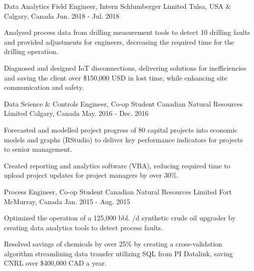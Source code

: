 \begin{cventries}
  \cventry
    {Data Analytics Field Engineer, Intern} %
    {Schlumberger Limited} %
    {Tulsa, USA \& Calgary, Canada} %
    {Jun. 2018 - Jul. 2018} %
    {
      \begin{cvitems} %
        \item {Analysed process data from drilling measurement tools to detect 10 drilling faults and provided adjustments for engineers, decreasing the required time for the drilling operation.}
        \item {Diagnosed and designed IoT disconnections, delivering solutions for inefficiencies and saving the client over \$150,000 USD in lost time, while enhancing site communication and safety.}
      \end{cvitems}
    }

  \cventry
    {Data Science \& Controls Engineer, Co-op Student} %
    {Canadian Natural Resources Limited} %
    {Calgary, Canada} %
    {May. 2016 - Dec. 2016} %
    {
      \begin{cvitems} %
        \item {Forecasted and modelled project progress of 80 capital projects into economic models and graphs (RStudio) to deliver key performance indicators for projects to senior management.}
        \item {Created reporting and analytics software (VBA), reducing required time to upload project updates for project managers by over 30\%.}
      \end{cvitems}
    }


  \cventry
    {Process Engineer, Co-op Student} %
    {Canadian Natural Resources Limited} %
    {Fort McMurray, Canada} %
    {Jan. 2015 - Aug. 2015} %
    {
      \begin{cvitems} %
        \item {Optimized the operation of a 125,000 bbl. /d synthetic crude oil upgrader by creating data analytics tools to detect process faults.}
        \item {Resolved savings of chemicals by over 25\% by creating a cross-validation algorithm streamlining data transfer utilizing SQL from PI Datalink, saving CNRL over \$400,000 CAD a year.}
      \end{cvitems}
    }

\end{cventries}
